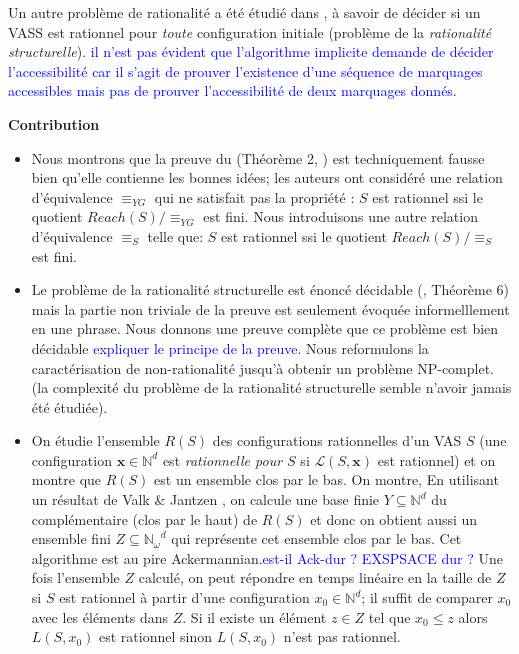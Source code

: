 \documentclass[a4paper,final]{article}
\theoremstyle{definition}
\let\leq\leqslant
\newcommand{\alain}[1]{\textcolor{blue}{#1}}
\newcommand{\N}{\ensuremath{\mathbb{N}}}
\newcommand{\Nomega}{\ensuremath{\mathbb{N}_\omega}}
\newcommand{\lang}{\ensuremath{\mathcal{L}}}
\newcommand{\vect}[1]{\ensuremath{\mathbf{#1}}}
\begin{document}
Un autre problème de rationalité a été étudié dans  \cite{vavn81}, à savoir de décider si un VASS est rationnel pour \emph{toute} configuration initiale (problème de la  \emph{rationalité structurelle}).
\alain{il n'est pas évident que l'algorithme implicite demande de décider l'accessibilité car il s'agit de prouver l'existence d'une séquence de marquages accessibles mais pas de prouver l'accessibilité de deux marquages donnés.} 


{\bf Contribution}
\begin{itemize}
\item Nous montrons que la preuve du (Théorème 2, \cite{giyo80}) est techniquement fausse bien qu'elle contienne les bonnes idées; les auteurs ont considéré une relation d'équivalence $\equiv_{YG}$ qui ne satisfait pas la propriété : $S$ est rationnel ssi  le quotient $Reach(S)/\equiv_{YG}$ est fini. Nous introduisons une autre relation d'équivalence $\equiv_S$ telle que: $S$ est rationnel ssi  le quotient $Reach(S)/\equiv_S$ est fini.
    \item  Le problème de la rationalité structurelle est énoncé décidable (\cite{vavn81}, Théorème 6) mais la partie non triviale de la preuve est seulement évoquée informelllement en une phrase. Nous donnons une preuve complète que ce problème est bien décidable  \alain{expliquer le principe de la preuve}. Nous reformulons la caractérisation de non-rationalité jusqu'à obtenir un problème NP-complet.  (la complexité du problème de la rationalité structurelle semble n'avoir jamais été étudiée). 
  
    \item On étudie l'ensemble $R(S)$ des configurations rationnelles d'un VAS $S$ (une configuration $\vect{x} \in \N^d$ est \emph{rationnelle pour $S$} si $\lang(S,\vect{x})$ est rationnel) et on montre que $R(S)$ est un ensemble clos par le bas. On montre, En utilisant un résultat de Valk \& Jantzen \cite{vaja85}, on calcule une base finie $Y \subseteq \N^d$ du complémentaire (clos par le haut) de $R(S)$ et donc on obtient aussi un ensemble fini $Z \subseteq \Nomega^d$ qui représente cet ensemble clos par le bas. Cet algorithme est au pire Ackermannian.\alain{est-il Ack-dur ? EXSPSACE dur ?}
Une fois l'ensemble $Z$ calculé, on peut répondre en temps linéaire en la taille de $Z$ si $S$ est rationnel à partir d'une configuration $x_0 \in \N^d$; il suffit de comparer $x_0$ avec les éléments dans $Z$. Si il existe un élément $z \in Z$ tel que $x_0 \leq z$ alors $L(S,x_0)$ est rationnel sinon $L(S,x_0)$ n'est pas rationnel. 

\end{itemize}
\iffalse
\end{document}
